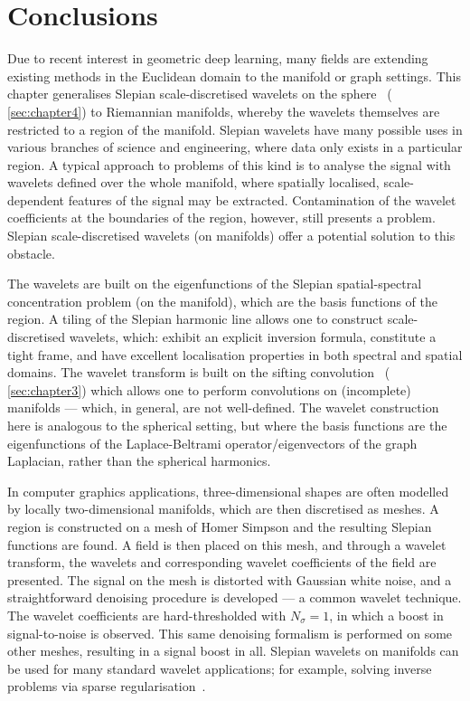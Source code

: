 





\section{Conclusions}\label{sec:chapter5_conclusions}

Due to recent interest in geometric deep learning, many fields are extending existing methods in the Euclidean domain to the manifold or graph settings.
This chapter generalises Slepian scale-discretised wavelets on the sphere~\cite{Roddy2021a} (\cf{} \cref{sec:chapter4}) to Riemannian manifolds, whereby the wavelets themselves are restricted to a region of the manifold.
Slepian wavelets have many possible uses in various branches of science and engineering, where data only exists in a particular region.
A typical approach to problems of this kind is to analyse the signal with wavelets defined over the whole manifold, where spatially localised, scale-dependent features of the signal may be extracted.
Contamination of the wavelet coefficients at the boundaries of the region, however, still presents a problem.
Slepian scale-discretised wavelets (on manifolds) offer a potential solution to this obstacle.

The wavelets are built on the eigenfunctions of the Slepian spatial-spectral concentration problem (on the manifold), which are the basis functions of the region.
A tiling of the Slepian harmonic line allows one to construct scale-discretised wavelets, which: exhibit an explicit inversion formula, constitute a tight frame, and have excellent localisation properties in both spectral and spatial domains.
The wavelet transform is built on the sifting convolution~\cite{Roddy2021} (\cf{} \cref{sec:chapter3}) which allows one to perform convolutions on (incomplete) manifolds --- which, in general, are not well-defined.
The wavelet construction here is analogous to the spherical setting, but where the basis functions are the eigenfunctions of the Laplace-Beltrami operator/eigenvectors of the graph Laplacian, rather than the spherical harmonics.

In computer graphics applications, three-dimensional shapes are often modelled by locally two-dimensional manifolds, which are then discretised as meshes.
A region is constructed on a mesh of Homer Simpson and the resulting Slepian functions are found.
A field is then placed on this mesh, and through a wavelet transform, the wavelets and corresponding wavelet coefficients of the field are presented.
The signal on the mesh is distorted with Gaussian white noise, and a straightforward denoising procedure is developed --- a common wavelet technique.
The wavelet coefficients are hard-thresholded with \(N_{\sigma}=1\), in which a boost in signal-to-noise is observed.
This same denoising formalism is performed on some other meshes, resulting in a signal boost in all.
Slepian wavelets on manifolds can be used for many standard wavelet applications; for example, solving inverse problems via sparse regularisation~\cite{McEwen2013a,Wallis2017,Price2021}.
